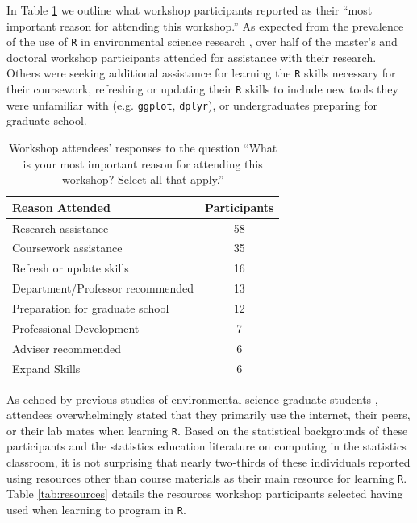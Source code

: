 \documentclass[12pt]{article}
\begin{document}
\quad In Table \ref{tab:reasons} we outline what workshop participants reported
as their ``most important reason for attending this workshop.'' As expected from
the prevalence of the use of \texttt{R} in environmental science research 
\citep{Rpopular, mislan}, over half of the master's and doctoral workshop 
participants attended for assistance with their research. Others were seeking
additional assistance for learning the \texttt{R} skills necessary for their 
coursework, refreshing or updating their \texttt{R} skills to include new tools
they were unfamiliar with (e.g. \texttt{ggplot}, \texttt{dplyr}), or
undergraduates preparing for graduate school.  

{
\begin{table}[h!]
    \centering
    \begin{tabular}{lc}
\hline
Reason Attended & Participants \\
\hline
Research assistance &  58 \\
Coursework assistance &  35 \\
Refresh or update skills &  16 \\
Department/Professor recommended &  13 \\
Preparation for graduate school &  12 \\
Professional Development &   7 \\
Adviser recommended &   6 \\
Expand Skills & 6 \\
\hline
\end{tabular}
\caption{Workshop attendees' responses to the question ``What is your most 
important reason for attending this workshop? Select all that apply.''}
    \label{tab:reasons}
\end{table}
}

\quad As echoed by previous studies of environmental science graduate students
\citep{datacarpentry, theobold}, attendees overwhelmingly stated that they
primarily use the internet, their peers, or their lab mates when learning 
\texttt{R}. Based on the statistical backgrounds of these participants and the
statistics education literature on computing in the statistics classroom, it is
not surprising that nearly two-thirds of these individuals reported using
resources other than course materials as their main resource for learning 
\texttt{R}. Table \ref{tab:resources} details the resources workshop
participants selected having used when learning to program in \texttt{R}. 
\end{document}
